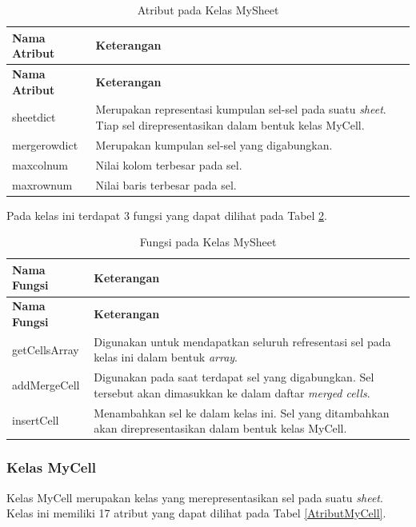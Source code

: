 	\begin{small}
	\begin{longtable}{ | p{3cm} | p{8cm} | }
	    \caption{Atribut pada Kelas MySheet}
	    \label{AtributMySheet}\\ \hline
	    \centering\bfseries{Nama Atribut} & \centering\bfseries{Keterangan} \tabularnewline \hline
	    \endfirsthead
	    \hline
	    \centering\bfseries{Nama Atribut} & \centering\bfseries{Keterangan} \tabularnewline \hline
	    \endhead
	    sheetdict & Merupakan representasi kumpulan sel-sel pada suatu \textit{sheet}. Tiap sel direpresentasikan dalam bentuk kelas MyCell.\\ \hline
	    mergerowdict & Merupakan kumpulan sel-sel yang digabungkan.\\ \hline
	    maxcolnum & Nilai kolom terbesar pada sel.\\ \hline
	    maxrownum & Nilai baris terbesar pada sel.\\ \hline
	\end{longtable}
	\end{small}

	Pada kelas ini terdapat 3 fungsi yang dapat dilihat pada Tabel \ref{FungsiMySheet}.

	\begin{small}
	\begin{longtable}{ | p{4cm} | p{9cm} | }
	    \caption{Fungsi pada Kelas MySheet}
	    \label{FungsiMySheet}\\ \hline
	    \centering\bfseries{Nama Fungsi} & \centering\bfseries{Keterangan} \tabularnewline \hline
	    \endfirsthead
	    \hline
	    \centering\bfseries{Nama Fungsi} & \centering\bfseries{Keterangan} \tabularnewline \hline
	    \endhead
	    getCellsArray & Digunakan untuk mendapatkan seluruh refresentasi sel pada kelas ini dalam bentuk \textit{array}.\\ \hline
	    addMergeCell & Digunakan pada saat terdapat sel yang digabungkan. Sel tersebut akan dimasukkan ke dalam daftar \textit{merged cells}.\\ \hline
	    insertCell & Menambahkan sel ke dalam kelas ini. Sel yang ditambahkan akan direpresentasikan dalam bentuk kelas MyCell.\\ \hline
	\end{longtable}
	\end{small}

	\subsubsection{Kelas MyCell}
	Kelas MyCell merupakan kelas yang merepresentasikan sel pada suatu \textit{sheet}. Kelas ini memiliki 17 atribut yang dapat dilihat pada Tabel \ref{AtributMyCell}.

